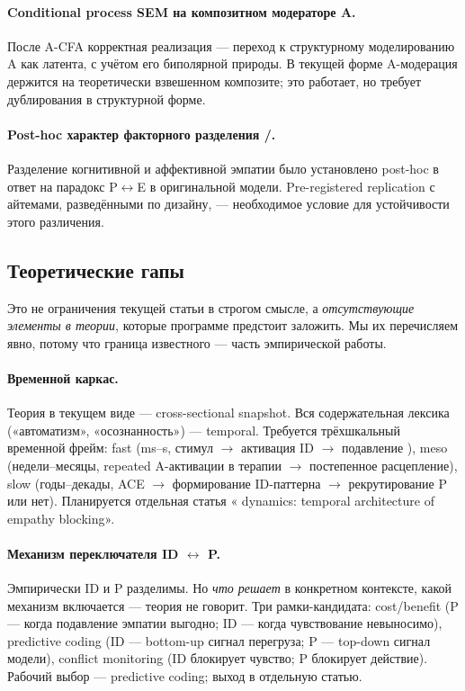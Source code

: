 \paragraph{Conditional process SEM на композитном модераторе A.} После A-CFA корректная реализация --- переход к структурному моделированию A как латента, с учётом его биполярной природы. В текущей форме A-модерация держится на теоретически взвешенном композите; это работает, но требует дублирования в структурной форме.

\paragraph{Post-hoc характер факторного разделения \EAF{}/\Ecog{}.} Разделение когнитивной и аффективной эмпатии было установлено post-hoc в ответ на парадокс P$\leftrightarrow$E в оригинальной модели. Pre-registered replication с айтемами, разведёнными по дизайну, --- необходимое условие для устойчивости этого различения.

\subsection{Теоретические гапы}

Это не ограничения текущей статьи в строгом смысле, а \emph{отсутствующие элементы в теории}, которые программе предстоит заложить. Мы их перечисляем явно, потому что граница известного --- часть эмпирической работы.

\paragraph{Временной каркас.} Теория в текущем виде --- cross-sectional snapshot. Вся содержательная лексика («автоматизм», «осознанность») --- temporal. Требуется трёхшкальный временной фрейм: fast (ms--s, стимул $\to$ активация ID $\to$ подавление \EAF{}), meso (недели--месяцы, repeated A-активации в терапии $\to$ постепенное расцепление), slow (годы--декады, ACE $\to$ формирование ID-паттерна $\to$ рекрутирование P или нет). Планируется отдельная статья «\DEIC{} dynamics: temporal architecture of empathy blocking».

\paragraph{Механизм переключателя ID $\leftrightarrow$ P.} Эмпирически ID и P разделимы. Но \emph{что решает} в конкретном контексте, какой механизм включается --- теория не говорит. Три рамки-кандидата: cost/benefit (P --- когда подавление эмпатии выгодно; ID --- когда чувствование невыносимо), predictive coding (ID --- bottom-up сигнал перегруза; P --- top-down сигнал модели), conflict monitoring (ID блокирует чувство; P блокирует действие). Рабочий выбор --- predictive coding; выход в отдельную статью.

